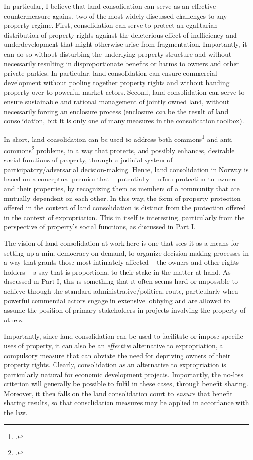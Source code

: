 In particular, I believe that land consolidation can serve as an effective countermeasure against two of the most widely discussed challenges to any property regime. First, consolidation can serve to protect an egalitarian distribution of property rights against the deleterious effect of inefficiency and underdevelopment that might otherwise arise from fragmentation. Importantly, it can do so without disturbing the underlying property structure and without necessarily resulting in disproportionate benefits or harms to owners and other private parties. In particular, land consolidation can ensure commercial development without pooling together property rights and without handing property over to powerful market actors. Second, land consolidation can serve to ensure sustainable and rational management of jointly owned land, without necessarily forcing an enclosure process (enclosure {\it can} be the result of land consolidation, but it is only one of many measures in the consolidation toolbox).

In short, land consolidation can be used to address both commons\footcite{hardin68} and anti-commons\footcite{heller98} problems, in a way that protects, and possibly enhances, desirable social functions of property, through a judicial system of participatory/adversarial decision-making. Hence, land consolidation in Norway is based on a conceptual premise that -- potentially -- offers protection to owners and their properties, by recognizing them as members of a community that are mutually dependent on each other. In this way, the form of property protection offered in the context of land consolidation is distinct from the protection offered in the context of expropriation. This in itself is interesting, particularly from the perspective of property's social functions, as discussed in Part I.

The vision of land consolidation at work here is one that sees it as a means for setting up a mini-democracy on demand, to organize decision-making processes in a way that grants those most intimately affected -- the owners and other rights holders -- a say that is proportional to their stake in the matter at hand. As discussed in Part I, this is something that it often seems hard or impossible to achieve through the standard administrative/political route, particularly when powerful commercial actors engage in extensive lobbying and are allowed to assume the position of primary stakeholders in projects involving the property of others.

Importantly, since land consolidation can be used to facilitate or impose specific uses of property, it can also be an {\it effective} alternative to expropriation, a compulsory measure that can obviate the need for depriving owners of their property rights. Clearly, consolidation as an alternative to expropriation is particularly natural for economic development projects. Importantly, the no-loss criterion will generally be possible to fulfil in these cases, through benefit sharing. Moreover, it then falls on the land consolidation court to {\it ensure} that benefit sharing results, so that consolidation measures may be applied in accordance with the law.

